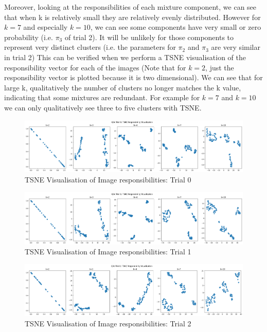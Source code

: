 \documentclass[12pt]{article}
\begin{document}
\begin{enumerate}
\newpage

Moreover, looking at the responsibilities of each mixture component, we can see that when k is relatively small they are relatively evenly distributed. However for $k=7$ and especially $k=10$, we can see some components have very small or zero probability (i.e. $\pi_3$ of trial 2). It will be unlikely for those components to represent very distinct clusters (i.e. the parameters for $\pi_2$ and $\pi_3$ are very similar in trial 2) This can be verified when we perform a TSNE visualisation of the responsibility vector for each of the images (Note that for $k=2$, just the responsibility vector is plotted because it is two dimensional). We can see that for large k, qualitatively the number of clusters no longer matches the k value, indicating that some mixtures are redundant. For example for $k=7$ and $k=10$ we can only qualitatively see three to five clusters with TSNE.

\begin{figure}[h]
  \centering
  \includegraphics[scale=0.35]{outputs/q3/q3e-0-tsne}
  \caption{TSNE Visualisation of Image responsibilities: Trial 0}
  \label{fig:3e-tsne-0}
\end{figure}
\begin{figure}[h]
  \centering
  \includegraphics[scale=0.35]{outputs/q3/q3e-1-tsne}
  \caption{TSNE Visualisation of Image responsibilities: Trial 1}
  \label{fig:3e-tsne-1}
\end{figure}
\begin{figure}[h]
  \centering
  \includegraphics[scale=0.35]{outputs/q3/q3e-2-tsne}
  \caption{TSNE Visualisation of Image responsibilities: Trial 2}
  \label{fig:3e-tsne-2}
\end{figure}
\newpage


\end{enumerate}
\end{document}

